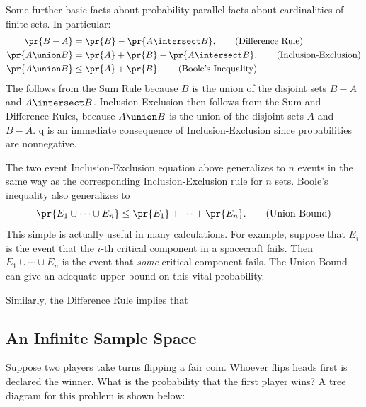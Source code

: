 Some further basic facts about probability parallel facts about
cardinalities of finite sets.  In particular:
\begin{align}
\pr{B-A}        & =  \pr{B} - \pr{A \intersect B},\tag{Difference Rule}\\
\pr{A \union B} & =  \pr{A} + \pr{B} - \pr{A \intersect B},
                  \tag{Inclusion-Exclusion}\\
\pr{A \union B} & \le  \pr{A} + \pr{B}. \tag{Boole's Inequality}
\end{align}
The  follows from the Sum Rule because $B$ is the
union of the disjoint sets $B-A$ and $A \intersect B$.
 Inclusion-Exclusion then
follows from the Sum and Difference Rules, because $A \union B$ is the
union of the disjoint sets $A$ and $B-A$.  q is an
immediate consequence of Inclusion-Exclusion since probabilities are
nonnegative.

The two event Inclusion-Exclusion equation above generalizes to $n$ events
in the same way as the corresponding Inclusion-Exclusion rule for $n$
sets.  Boole's inequality also generalizes to
\begin{equation}
\pr{E_1 \cup \cdots \cup E_n} \leq \pr{E_1} + \cdots + \pr{E_n}.\tag{Union Bound}
\end{equation}
This simple  is actually useful in many calculations.
For example, suppose that $E_i$ is the event that the $i$-th critical
component in a spacecraft fails.  Then $E_1 \cup \cdots \cup E_n$ is the
event that \emph{some} critical component fails.  The Union Bound can give
an adequate upper bound on this vital probability.

Similarly, the Difference Rule implies that


\subsection{An Infinite Sample Space}

Suppose two players take turns flipping a fair coin.  Whoever flips
heads first is declared the winner.  What is the probability that the
first player wins?  A tree diagram for this problem is shown below:


